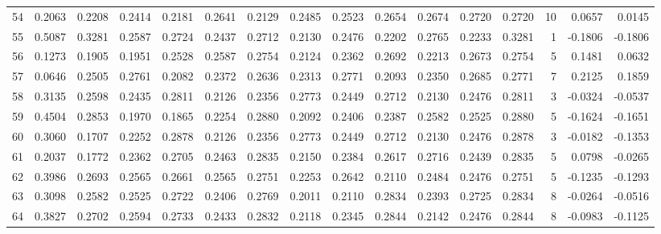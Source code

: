 \begin{tabular}{lrrrrrrrrrrrrrrr}
54  &      0.2063 &  0.2208 &  0.2414 &  0.2181 &  0.2641 &  0.2129 &  0.2485 &  0.2523 &  0.2654 &  0.2674 &   0.2720 &     0.2720 &     10 &                    0.0657 &                     0.0145 \\
55  &      0.5087 &  0.3281 &  0.2587 &  0.2724 &  0.2437 &  0.2712 &  0.2130 &  0.2476 &  0.2202 &  0.2765 &   0.2233 &     0.3281 &      1 &                   -0.1806 &                    -0.1806 \\
56  &      0.1273 &  0.1905 &  0.1951 &  0.2528 &  0.2587 &  0.2754 &  0.2124 &  0.2362 &  0.2692 &  0.2213 &   0.2673 &     0.2754 &      5 &                    0.1481 &                     0.0632 \\
57  &      0.0646 &  0.2505 &  0.2761 &  0.2082 &  0.2372 &  0.2636 &  0.2313 &  0.2771 &  0.2093 &  0.2350 &   0.2685 &     0.2771 &      7 &                    0.2125 &                     0.1859 \\
58  &      0.3135 &  0.2598 &  0.2435 &  0.2811 &  0.2126 &  0.2356 &  0.2773 &  0.2449 &  0.2712 &  0.2130 &   0.2476 &     0.2811 &      3 &                   -0.0324 &                    -0.0537 \\
59  &      0.4504 &  0.2853 &  0.1970 &  0.1865 &  0.2254 &  0.2880 &  0.2092 &  0.2406 &  0.2387 &  0.2582 &   0.2525 &     0.2880 &      5 &                   -0.1624 &                    -0.1651 \\
60  &      0.3060 &  0.1707 &  0.2252 &  0.2878 &  0.2126 &  0.2356 &  0.2773 &  0.2449 &  0.2712 &  0.2130 &   0.2476 &     0.2878 &      3 &                   -0.0182 &                    -0.1353 \\
61  &      0.2037 &  0.1772 &  0.2362 &  0.2705 &  0.2463 &  0.2835 &  0.2150 &  0.2384 &  0.2617 &  0.2716 &   0.2439 &     0.2835 &      5 &                    0.0798 &                    -0.0265 \\
62  &      0.3986 &  0.2693 &  0.2565 &  0.2661 &  0.2565 &  0.2751 &  0.2253 &  0.2642 &  0.2110 &  0.2484 &   0.2476 &     0.2751 &      5 &                   -0.1235 &                    -0.1293 \\
63  &      0.3098 &  0.2582 &  0.2525 &  0.2722 &  0.2406 &  0.2769 &  0.2011 &  0.2110 &  0.2834 &  0.2393 &   0.2725 &     0.2834 &      8 &                   -0.0264 &                    -0.0516 \\
64  &      0.3827 &  0.2702 &  0.2594 &  0.2733 &  0.2433 &  0.2832 &  0.2118 &  0.2345 &  0.2844 &  0.2142 &   0.2476 &     0.2844 &      8 &                   -0.0983 &                    -0.1125 \\

\end{tabular}
